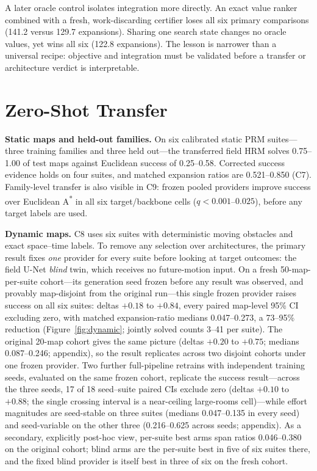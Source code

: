 \documentclass[letterpaper]{article} %
\newcommand{\stage}[1]{\textsc{#1}}
\begin{document}
A later oracle control isolates integration more directly. An exact value ranker combined with a fresh, work-discarding certifier loses all six primary comparisons (141.2 versus 129.7 expansions). Sharing one search state changes no oracle values, yet wins all six (122.8 expansions). The lesson is narrower than a universal recipe: objective and integration must be validated before a transfer or architecture verdict is interpretable.

\section{Zero-Shot Transfer}

\textbf{Static maps and held-out families.} On six calibrated static PRM suites---three training families and three held out---the transferred field HRM solves 0.75--1.00 of test maps against Euclidean success of 0.25--0.58. Corrected success evidence holds on four suites, and matched expansion ratios are 0.521--0.850 (\stage{C7}). Family-level transfer is also visible in \stage{C9}: frozen pooled providers improve success over Euclidean A\textsuperscript{*} in all six target/backbone cells ($q<0.001$--$0.025$), before any target labels are used.

\textbf{Dynamic maps.} \stage{C8} uses six suites with deterministic moving obstacles and exact space--time labels. To remove any selection over architectures, the primary result fixes \emph{one} provider for every suite before looking at target outcomes: the field U-Net \emph{blind} twin, which receives no future-motion input. On a fresh 50-map-per-suite cohort---its generation seed frozen before any result was observed, and provably map-disjoint from the original run---this single frozen provider raises success on all six suites: deltas $+0.18$ to $+0.84$, every paired map-level 95\% CI excluding zero, with matched expansion-ratio medians 0.047--0.273, a 73--95\% reduction (Figure~\ref{fig:dynamic}; jointly solved counts 3--41 per suite). The original 20-map cohort gives the same picture (deltas $+0.20$ to $+0.75$; medians 0.087--0.246; appendix), so the result replicates across two disjoint cohorts under one frozen provider. Two further full-pipeline retrains with independent training seeds, evaluated on the same frozen cohort, replicate the success result---across the three seeds, 17 of 18 seed--suite paired CIs exclude zero (deltas $+0.10$ to $+0.88$; the single crossing interval is a near-ceiling large-rooms cell)---while effort magnitudes are seed-stable on three suites (medians 0.047--0.135 in every seed) and seed-variable on the other three (0.216--0.625 across seeds; appendix). As a secondary, explicitly post-hoc view, per-suite best arms span ratios 0.046--0.380 on the original cohort; blind arms are the per-suite best in five of six suites there, and the fixed blind provider is itself best in three of six on the fresh cohort.
\end{document}
